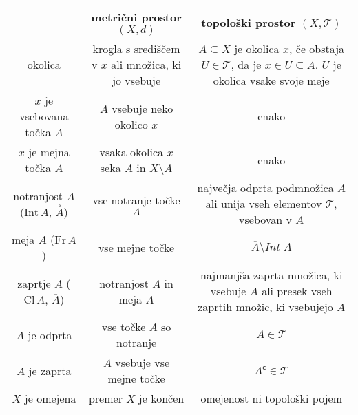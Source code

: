 \documentclass[10pt, a4paper]{article}
\newcommand{\stcomp}[1]{{#1}^{\mathsf{c}}}
\newcommand{\cl}{\mathrm{Cl}}
\newcommand{\inte}{\mathrm{Int}}
\newcommand{\fr}{\mathrm{Fr}}
\begin{document}
\begin{table}[bth!]
  \centering
  \begin{tabular}{ccc}
    \toprule
                                  & metrični prostor $(X, d)$                                              & topološki prostor $(X, \mathcal{T})$\\
    \midrule
    okolica                       & \makecell{krogla s središčem v $x$\\ ali množica, ki jo vsebuje}       & \makecell{$A \subseteq X$ je okolica $x$, če obstaja\\ $U \in \mathcal{T}$, da je $x \in U \subseteq A$.\\$U$ je okolica vsake svoje meje} \\         
    \midrule
    $x$ je vsebovana točka $A$    & $A$ vsebuje neko okolico $x$                                           & enako\\
    \midrule
    $x$ je mejna točka $A$        & vsaka okolica $x$ seka $A$ in $X \setminus A$                          & enako\\
    \midrule
    notranjost $A$ ($\inte\, A$, $\overset{\circ}{A}$)    & vse notranje točke $A$                                                 & \makecell{največja odprta podmnožica\\ $A$ ali unija vseh elementov $\mathcal{T}$,\\vsebovan v $A$}\\
    \midrule
    meja $A$ ($\fr \, A$)                     & vse mejne točke                                                        & $\overline{A} \setminus Int\; A$\\
    \midrule
    zaprtje $A$ ($\cl\, A$, $\overline{A}$)  & notranjost $A$ in meja $A$                                             & \makecell{najmanjša zaprta množica,\\ ki vsebuje $A$ ali presek vseh\\zaprtih množic, ki vsebujejo $A$}\\
    \midrule 
    $A$ je odprta                 & vse točke $A$ so notranje                                              & $A \in \mathcal{T}$\\
    \midrule
    $A$ je zaprta                 & $A$ vsebuje vse mejne točke                                            & $\stcomp{A} \in \mathcal{T}$\\
    \midrule
    $X$ je omejena                & premer $X$ je končen                                                   & omejenost ni topološki pojem\\

\end{tabular}
\end{table}
\end{document}

